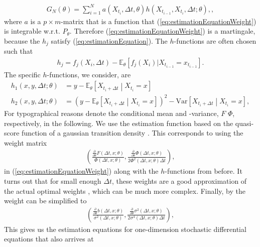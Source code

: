 \begin{align}
    G_N(\theta) = \sum_{i = 1}^N a\left(X_{t_i}, \Delta t, \theta \right)h(X_{t_{i - 1}}, X_{t_i}, \Delta t; \theta), \label{eq:estimationEquationWeight},
\end{align}
where $a$ is a $p\times m$-matrix that is a function that (\ref{eq:estimationEquationWeight}) is integrable w.r.t. $P_\theta$. Therefore (\ref{eq:estimationEquationWeight}) is a martingale, because the $h_j$ satisfy (\ref{eq:estimationEquation}). The $h$-functions are often chosen such that
\begin{align}
    h_j = f_j(X_i, \Delta t) - \mathbb{E}_\theta\left[f_j(X_i)| X_{t_{i - 1}} = x_{t_{i - 1}}\right].
\end{align}
The specific $h$-functions, we consider, are
\begin{align}
    h_1(x,y, \Delta t; \theta) &= y - \mathbb{E}_\theta\left[X_{t_i + \Delta t} \middle| X_{t_{i}} = x\right] \\
    h_2(x,y, \Delta t; \theta) &= \left(y - \mathbb{E}_\theta\left[X_{t_i + \Delta t} \middle| X_{t_{i}} = x\right]\right)^2 - \mathrm{Var}\left[X_{t_i + \Delta t} \middle| X_{t_{i}} = x\right],
\end{align}
For typographical reasons denote the conditional mean and -variance, $F$ $\Phi$, respectively, in the following.
 We use the estimation function based on the quasi-score function of a gaussian transition density \cite[equation (1.28)]{StatisticalMethodsForSDE}. This corresponds to using the weight matrix
 \begin{align}
    \left(\frac{\frac{\partial}{\partial\theta}F(\Delta t, x;\theta)}{\Phi\left(\Delta t, x; \theta\right)} , \frac{\frac{\partial}{\partial\theta}\Phi(\Delta t, x;\theta)}{2\Phi^2(\Delta t, x;\theta)\Delta t} \right),
\end{align}
in (\ref{eq:estimationEquationWeight}) along with the $h$-functions from before. It turns out that for small enough $\Delta t$, these weights are a good approximation of the actual optimal weights \cite[equation (1.32)]{StatisticalMethodsForSDE}, which can be much more complex. Finally, by \cite[lemma 1.10]{StatisticalMethodsForSDE} the weight can be simplified to
\begin{align}
    \left(\frac{\frac{\partial}{\partial\theta}b(\Delta t, x;\theta)}{\sigma^2\left(\Delta t, x; \theta\right)} , \frac{\frac{\partial}{\partial\theta}\sigma^2(\Delta t, x;\theta)}{2\sigma^4(\Delta t, x;\theta)\Delta t} \right),
\end{align}
This gives us the estimation equations for one-dimension stochastic differential equations that \cite[Example 1.11]{StatisticalMethodsForSDE} also arrives at
